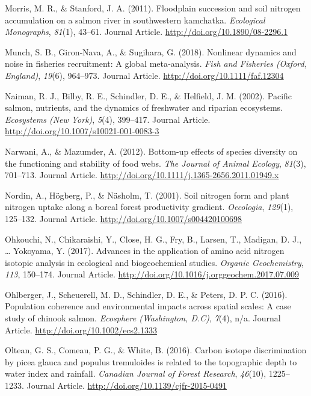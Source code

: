 \documentclass [11pt, proquest] {uwthesis}[2015/03/03]
\begin{document}
\hypertarget{ref-Morris2011}{}
Morris, M. R., \& Stanford, J. A. (2011). Floodplain succession and soil
nitrogen accumulation on a salmon river in southwestern kamchatka.
\emph{Ecological Monographs}, \emph{81}(1), 43--61. Journal Article.
\url{http://doi.org/10.1890/08-2296.1}

\hypertarget{ref-Munch2018}{}
Munch, S. B., Giron‐Nava, A., \& Sugihara, G. (2018). Nonlinear dynamics
and noise in fisheries recruitment: A global meta‐analysis. \emph{Fish
and Fisheries (Oxford, England)}, \emph{19}(6), 964--973. Journal
Article. \url{http://doi.org/10.1111/faf.12304}

\hypertarget{ref-Naiman2002}{}
Naiman, R. J., Bilby, R. E., Schindler, D. E., \& Helfield, J. M.
(2002). Pacific salmon, nutrients, and the dynamics of freshwater and
riparian ecosystems. \emph{Ecosystems (New York)}, \emph{5}(4),
399--417. Journal Article.
\url{http://doi.org/10.1007/s10021-001-0083-3}

\hypertarget{ref-Narwani2012}{}
Narwani, A., \& Mazumder, A. (2012). Bottom-up effects of species
diversity on the functioning and stability of food webs. \emph{The
Journal of Animal Ecology}, \emph{81}(3), 701--713. Journal Article.
\url{http://doi.org/10.1111/j.1365-2656.2011.01949.x}

\hypertarget{ref-Nordin2001}{}
Nordin, A., Högberg, P., \& Näsholm, T. (2001). Soil nitrogen form and
plant nitrogen uptake along a boreal forest productivity gradient.
\emph{Oecologia}, \emph{129}(1), 125--132. Journal Article.
\url{http://doi.org/10.1007/s004420100698}

\hypertarget{ref-Ohkouchi2017}{}
Ohkouchi, N., Chikaraishi, Y., Close, H. G., Fry, B., Larsen, T.,
Madigan, D. J., \ldots{} Yokoyama, Y. (2017). Advances in the
application of amino acid nitrogen isotopic analysis in ecological and
biogeochemical studies. \emph{Organic Geochemistry}, \emph{113},
150--174. Journal Article.
\url{http://doi.org/10.1016/j.orggeochem.2017.07.009}

\hypertarget{ref-Ohlberger2016}{}
Ohlberger, J., Scheuerell, M. D., Schindler, D. E., \& Peters, D. P. C.
(2016). Population coherence and environmental impacts across spatial
scales: A case study of chinook salmon. \emph{Ecosphere (Washington,
D.C)}, \emph{7}(4), n/a. Journal Article.
\url{http://doi.org/10.1002/ecs2.1333}

\hypertarget{ref-Oltean2016}{}
Oltean, G. S., Comeau, P. G., \& White, B. (2016). Carbon isotope
discrimination by picea glauca and populus tremuloides is related to the
topographic depth to water index and rainfall. \emph{Canadian Journal of
Forest Research}, \emph{46}(10), 1225--1233. Journal Article.
\url{http://doi.org/10.1139/cjfr-2015-0491}
\end{document}

